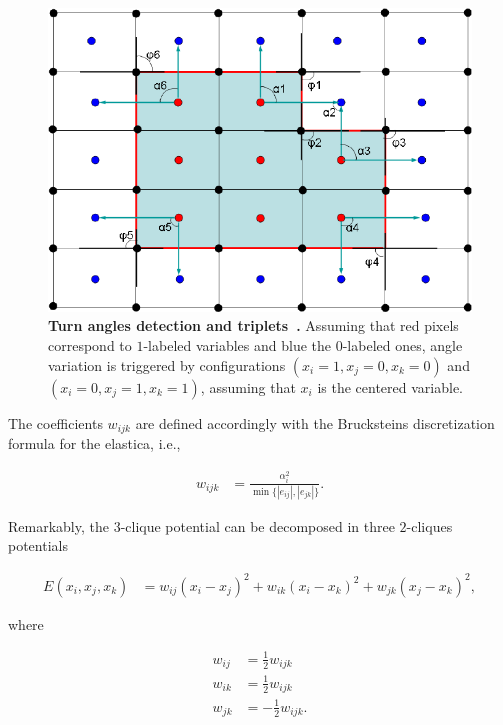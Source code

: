 \begin{figure}
\center
\includegraphics[scale=0.25]{figures/chapter3/elzehiry/turn-angles.png}
\caption{\textbf{Turn angles detection and triplets~\cite{zehiry10fast}.} Assuming that red pixels correspond to $1$-labeled variables and blue the $0$-labeled ones, angle variation is triggered by configurations $(x_i=1,x_j=0,x_k=0)$ and $(x_i=0,x_j=1,x_k=1)$, assuming that $x_i$ is the centered variable. }
\label{ch3:fig:elzehiry-turn-angles}
\end{figure}

The coefficients $w_{ijk}$ are defined accordingly with the Brucksteins discretization formula for the elastica, i.e.,

\begin{align*}
	w_{ijk} &= \frac{ \alpha_i ^2}{\min \{ |e_{ij}|,|e_{jk}| \} }.
\end{align*}

Remarkably, the $3$-clique potential can be decomposed in three $2$-cliques potentials 

\begin{align}
	E(x_i,x_j,x_k) &= w_{ij}(x_i-x_j)^2 + w_{ik}(x_i-x_k)^2 + w_{jk}(x_j-x_k)^2,
	\label{ch3:eq:elzehiry-pairwise}
\end{align}

where

\begin{align*}
	w_{ij} &= \frac{1}{2}w_{ijk} \\
	w_{ik} &= \frac{1}{2}w_{ijk} \\	
	w_{jk} &= -\frac{1}{2}w_{ijk}.
\end{align*}

